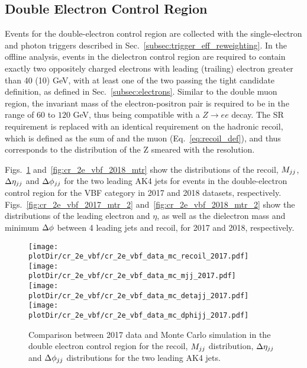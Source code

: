 \clearpage

\subsection{Double Electron Control Region}
\label{sec:selection_cr_2e}

Events for the double-electron control region are collected with the single-electron and 
photon triggers described in Sec.~\ref{subsec:trigger_eff_reweighting}. In the offline analysis, events in the dielectron 
control region are required to contain exactly two oppositely charged electrons with leading (trailing) 
electron \pt greater than 40 (10) GeV, with at least one of the two passing the tight candidate definition, as defined in Sec.~\ref{subsec:electrons}.
Similar to the double muon region, the invariant mass of the electron-positron pair is required to be in the range of $60$ to $120$ GeV,
thus being compatible with a $Z\rightarrow ee$ decay. 
The SR \ptmiss requirement is replaced with an identical requirement on the hadronic recoil, which is defined as the 
sum of \ptvecmiss and the muon \vpt (Eq.~\ref{eq:recoil_def}), and thus corresponds to the distribution of the Z \pt smeared with the \ptmiss resolution. 

Figs.~\ref{fig:cr_2e_vbf_2017_mtr} and~\ref{fig:cr_2e_vbf_2018_mtr} show the distributions of the recoil, $M_{jj}$, $\Delta \eta_{jj}$ and
$\Delta \phi_{jj}$ for the two leading AK4 jets for events in the double-electron control region for the VBF category 
in 2017 and 2018 datasets, respectively. 
Figs.~\ref{fig:cr_2e_vbf_2017_mtr_2} and~\ref{fig:cr_2e_vbf_2018_mtr_2} show the distributions of the leading electron \pt and $\eta$, 
as well as the dielectron mass and minimum $\Delta \phi$ between 4 leading jets and recoil, for 2017 and 2018, respectively.

\begin{figure}[htbp]
    \begin{center}
        \texttt{[image: \\plotDir/cr\_2e\_vbf/cr\_2e\_vbf\_data\_mc\_recoil\_2017.pdf]}
        \texttt{[image: \\plotDir/cr\_2e\_vbf/cr\_2e\_vbf\_data\_mc\_mjj\_2017.pdf]} \\
        \texttt{[image: \\plotDir/cr\_2e\_vbf/cr\_2e\_vbf\_data\_mc\_detajj\_2017.pdf]}
        \texttt{[image: \\plotDir/cr\_2e\_vbf/cr\_2e\_vbf\_data\_mc\_dphijj\_2017.pdf]}
    \end{center}
    \caption{Comparison between 2017 data and Monte Carlo simulation in the double electron control region for
        the recoil, $M_{jj}$ distribution, $\Delta \eta_{jj}$ and $\Delta \phi_{jj}$ distributions for the two leading AK4 jets.}
    \label{fig:cr_2e_vbf_2017_mtr}
\end{figure}

